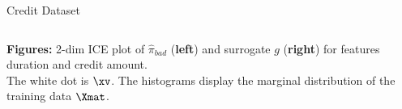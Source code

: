 \documentclass[11pt,compress,t,notes=noshow, xcolor=table]{beamer}
\newcommand{\pih}{\hat{\pi}}
\begin{document}
\begin{vbframe}{Credit Dataset}
\begin{columns}
\begin{column}{0.46\textwidth}
	\end{column}
\end{columns}
\vspace{-0.4cm}
\begin{center}
		\tiny{\textbf{Figures:} 2-dim ICE plot of $\pih_{bad}$ (\textbf{left}) and surrogate $g$ (\textbf{right}) for features duration and credit amount. \\The white dot is $\xv$. The histograms display the marginal distribution of the training data $\Xmat$.}
\end{center}

\end{vbframe}

%
%
%
\end{document}
